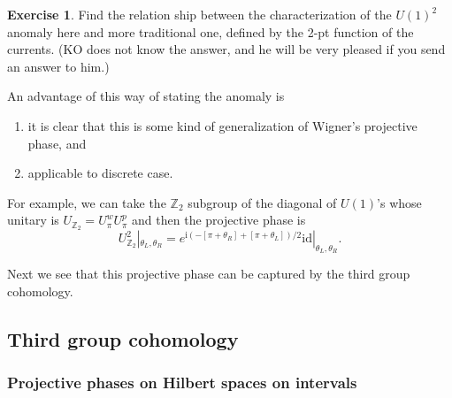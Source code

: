 \documentclass[
]{scrartcl}
\providecommand{\tightlist}{%
  \setlength{\itemsep}{0pt}\setlength{\parskip}{0pt}}
\numberwithin{equation}{section}
\theoremstyle{definition}
\theoremstyle{definition}
\theoremstyle{definition}
\newtheorem{exercise}{Exercise}[section]
\theoremstyle{definition}
\theoremstyle{remark}
\begin{document}
\begin{exercise}
Find the relation ship between the characterization of the \(U(1)^2\) anomaly here and more traditional one, defined by the 2-pt function of the currents. (KO does not know the answer, and he will be very pleased if you send an answer to him.)
\end{exercise}

An advantage of this way of stating the anomaly is

\begin{enumerate}
\def\labelenumi{\arabic{enumi}.}
\tightlist
\item
  it is clear that this is some kind of generalization of Wigner's projective phase, and
\item
  applicable to discrete case.
\end{enumerate}

For example, we can take the \(\mathbb{Z}_2\) subgroup of the diagonal of \(U(1)\)'s whose unitary is \(U_{\mathbb{Z}_2}=U^w_\pi U^p_\pi\) and then the projective phase is
\begin{equation}
    \label{eq:2dUZ2}
    U_{\mathbb{Z}_2}^2|_{\theta_L,\theta_R} = e^{\mathrm{i}(-[\pi+\theta_R]+[\pi+\theta_L])/2}\mathrm{id}|_{\theta_L,\theta_R}.
\end{equation}

Next we see that this projective phase can be captured by the third group cohomology.

\hypertarget{third-group-cohomology}{%
\subsection{Third group cohomology}\label{third-group-cohomology}}

\hypertarget{projective-phases-on-hilbert-spaces-on-intervals}{%
\subsubsection{Projective phases on Hilbert spaces on intervals}\label{projective-phases-on-hilbert-spaces-on-intervals}}
\end{document}
